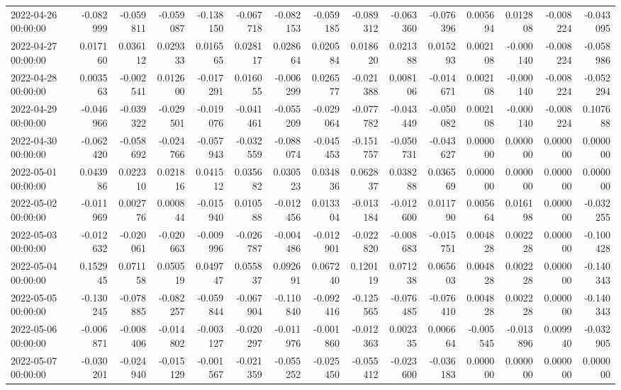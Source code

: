 \begin{tabular}{lrrrrrrrrrrrrrr}
2022-04-26 00:00:00 & -0.082999 & -0.059811 & -0.059087 & -0.138150 & -0.067718 & -0.082153 & -0.059185 & -0.089312 & -0.063360 & -0.076396 & 0.005694 & 0.012808 & -0.008224 & -0.043095 \\
2022-04-27 00:00:00 & 0.017160 & 0.036112 & 0.029333 & 0.016565 & 0.028117 & 0.028664 & 0.020584 & 0.018620 & 0.021388 & 0.015293 & 0.002108 & -0.000140 & -0.008224 & -0.058986 \\
2022-04-28 00:00:00 & 0.003563 & -0.002541 & 0.012600 & -0.017291 & 0.016055 & -0.006299 & 0.026577 & -0.021388 & 0.008106 & -0.014671 & 0.002108 & -0.000140 & -0.008224 & -0.052294 \\
2022-04-29 00:00:00 & -0.046966 & -0.039322 & -0.029501 & -0.019076 & -0.041461 & -0.055209 & -0.029064 & -0.077782 & -0.043449 & -0.050082 & 0.002108 & -0.000140 & -0.008224 & 0.107688 \\
2022-04-30 00:00:00 & -0.062420 & -0.058692 & -0.024766 & -0.057943 & -0.032559 & -0.088074 & -0.045453 & -0.151757 & -0.050731 & -0.043627 & 0.000000 & 0.000000 & 0.000000 & 0.000000 \\
2022-05-01 00:00:00 & 0.043986 & 0.022310 & 0.021816 & 0.041512 & 0.035682 & 0.030523 & 0.034836 & 0.062837 & 0.038288 & 0.036569 & 0.000000 & 0.000000 & 0.000000 & 0.000000 \\
2022-05-02 00:00:00 & -0.011969 & 0.002776 & 0.000844 & -0.015940 & 0.010588 & -0.012456 & 0.013304 & -0.013184 & -0.012600 & 0.011790 & 0.005664 & 0.016198 & 0.000000 & -0.032255 \\
2022-05-03 00:00:00 & -0.012632 & -0.020061 & -0.020663 & -0.009996 & -0.026787 & -0.004486 & -0.012901 & -0.022820 & -0.008683 & -0.015751 & 0.004828 & 0.002228 & 0.000000 & -0.100428 \\
2022-05-04 00:00:00 & 0.152945 & 0.071158 & 0.050519 & 0.049747 & 0.055837 & 0.092691 & 0.067240 & 0.120119 & 0.071238 & 0.065603 & 0.004828 & 0.002228 & 0.000000 & -0.140343 \\
2022-05-05 00:00:00 & -0.130245 & -0.078885 & -0.082257 & -0.059844 & -0.067904 & -0.110840 & -0.092416 & -0.125565 & -0.076485 & -0.076410 & 0.004828 & 0.002228 & 0.000000 & -0.140343 \\
2022-05-06 00:00:00 & -0.006871 & -0.008406 & -0.014802 & -0.003127 & -0.020297 & -0.011976 & -0.001860 & -0.012363 & 0.002335 & 0.006664 & -0.005545 & -0.013896 & 0.009940 & -0.032905 \\
2022-05-07 00:00:00 & -0.030201 & -0.024940 & -0.015129 & -0.001567 & -0.021359 & -0.055252 & -0.025450 & -0.055412 & -0.023600 & -0.036183 & 0.000000 & 0.000000 & 0.000000 & 0.000000 \\

\end{tabular}
